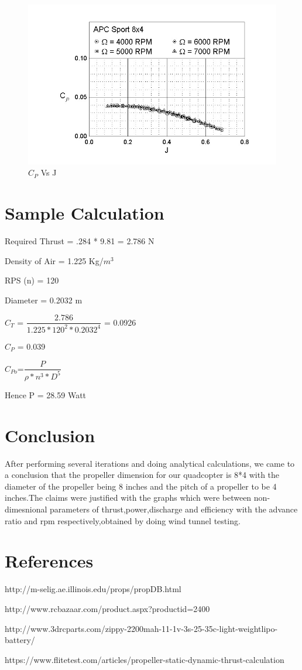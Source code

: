 \begin{figure}[H]
\centering
\includegraphics[scale=.7]{graph5}
\caption{$C_{P}$ Vs  J }
\label{graph}
\end{figure}

\newpage

\section{Sample Calculation}

Required Thrust = .284 * 9.81 = 2.786 N


Density of Air = 1.225 Kg/$m^{3}$

RPS (n) = 120

Diameter = 0.2032 m


$C_{T}$ = $\dfrac{2.786}{1.225 * 120^{2} * 0.2032^{4}}$ = 0.0926

$C_{P}$ = 0.039

$C_{Po}$=$\dfrac{P}{\rho*n^{3}*D^{5}}$

Hence P = 28.59 Watt

\section{Conclusion}
After performing several iterations and doing analytical calculations, we came to a conclusion that the propeller dimension for our quadcopter is 8*4 with the diameter of the propeller being 8 inches and the pitch of a propeller to be 4 inches.The claims were justified with the graphs which were between non-dimesnional parameters of thrust,power,discharge and efficiency with the advance ratio and rpm respectively,obtained by doing wind tunnel testing.

\section{References}
\itemize
\item http://m-selig.ae.illinois.edu/props/propDB.html
\item http://www.rcbazaar.com/product.aspx?productid=2400
\item http://www.3drcparts.com/zippy-2200mah-11-1v-3s-25-35c-light-weightlipo-battery/
\item https://www.flitetest.com/articles/propeller-static-dynamic-thrust-calculation